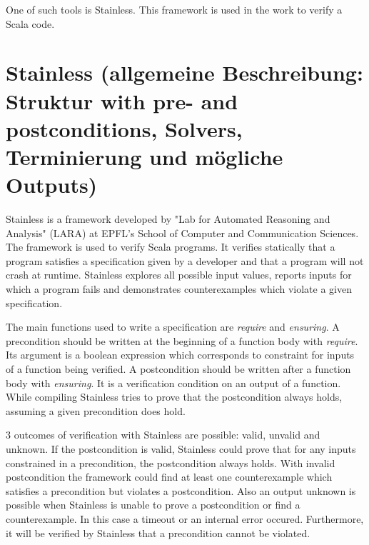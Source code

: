 One of such tools is Stainless. This framework is used in the work to verify a Scala code.

 


\section{Stainless (allgemeine Beschreibung: Struktur with pre- and postconditions, Solvers, Terminierung und mögliche Outputs)}
\label{sec:stainless}


Stainless is a framework developed by "Lab for Automated Reasoning and Analysis" (LARA) at EPFL's School of Computer and Communication Sciences. The framework is used to verify Scala programs.
It verifies statically that a program satisfies a specification given by a developer and that a program will not crash at runtime.
Stainless explores all possible input values, reports inputs for which a program fails and demonstrates counterexamples which violate a given specification.

The main functions used to write a specification are \textit{require} and \textit{ensuring}. 
A precondition should be written at the beginning of a function body with \textit{require}. Its argument is a boolean expression which corresponds to constraint for inputs of a function being verified.
A postcondition should be written after a function body with  \textit{ensuring}. It is a verification condition on an output of a function.
While compiling Stainless tries to prove that the postcondition always holds, assuming a given precondition does hold.

3 outcomes of verification with Stainless are possible: valid, unvalid and unknown. 
If the postcondition is valid, Stainless could prove that for any inputs constrained in a precondition, the postcondition always holds.
With invalid postcondition the framework could find at least one counterexample which satisfies a precondition but violates a postcondition.
Also an output unknown is possible when Stainless is unable to prove a postcondition or find a counterexample. In this case a timeout or an internal error occured.
Furthermore, it will be verified by Stainless that a precondition cannot be violated.

